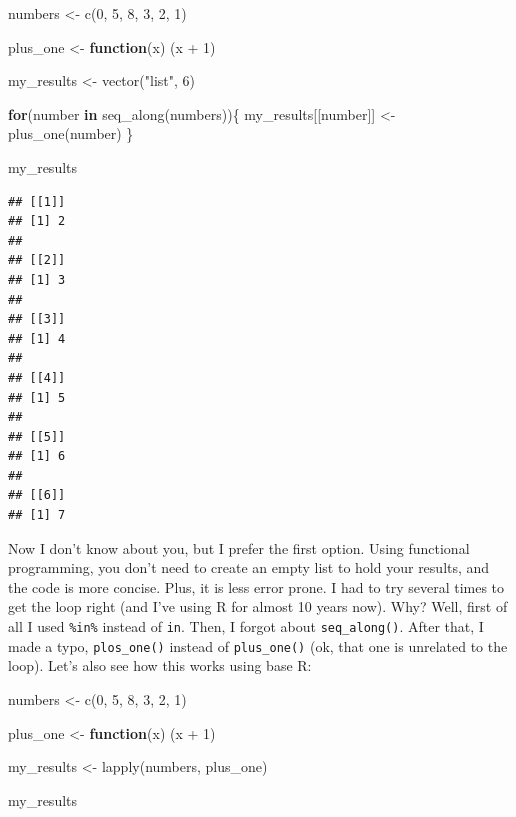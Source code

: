 \documentclass[
]{article}
\newenvironment{Shaded}{\begin{snugshade}}{\end{snugshade}}
\newcommand{\ControlFlowTok}[1]{\textcolor[rgb]{0.13,0.29,0.53}{\textbf{#1}}}
\newcommand{\DecValTok}[1]{\textcolor[rgb]{0.00,0.00,0.81}{#1}}
\newcommand{\FunctionTok}[1]{\textcolor[rgb]{0.00,0.00,0.00}{#1}}
\newcommand{\NormalTok}[1]{#1}
\newcommand{\OtherTok}[1]{\textcolor[rgb]{0.56,0.35,0.01}{#1}}
\newcommand{\SpecialCharTok}[1]{\textcolor[rgb]{0.00,0.00,0.00}{#1}}
\newcommand{\StringTok}[1]{\textcolor[rgb]{0.31,0.60,0.02}{#1}}
\begin{document}
\begin{Shaded}
\begin{Highlighting}[]
\NormalTok{numbers }\OtherTok{\textless{}{-}} \FunctionTok{c}\NormalTok{(}\DecValTok{0}\NormalTok{, }\DecValTok{5}\NormalTok{, }\DecValTok{8}\NormalTok{, }\DecValTok{3}\NormalTok{, }\DecValTok{2}\NormalTok{, }\DecValTok{1}\NormalTok{)}

\NormalTok{plus\_one }\OtherTok{\textless{}{-}} \ControlFlowTok{function}\NormalTok{(x) (x }\SpecialCharTok{+} \DecValTok{1}\NormalTok{)}

\NormalTok{my\_results }\OtherTok{\textless{}{-}} \FunctionTok{vector}\NormalTok{(}\StringTok{"list"}\NormalTok{, }\DecValTok{6}\NormalTok{)}

\ControlFlowTok{for}\NormalTok{(number }\ControlFlowTok{in} \FunctionTok{seq\_along}\NormalTok{(numbers))\{}
\NormalTok{  my\_results[[number]] }\OtherTok{\textless{}{-}} \FunctionTok{plus\_one}\NormalTok{(number)}
\NormalTok{\}}

\NormalTok{my\_results}
\end{Highlighting}
\end{Shaded}

\begin{verbatim}
## [[1]]
## [1] 2
## 
## [[2]]
## [1] 3
## 
## [[3]]
## [1] 4
## 
## [[4]]
## [1] 5
## 
## [[5]]
## [1] 6
## 
## [[6]]
## [1] 7
\end{verbatim}

Now I don't know about you, but I prefer the first option. Using functional programming, you don't
need to create an empty list to hold your results, and the code is more concise. Plus,
it is less error prone. I had to try several times to get the loop right
(and I've using R for almost 10 years now). Why? Well, first of all I used \texttt{\%in\%} instead of \texttt{in}.
Then, I forgot about \texttt{seq\_along()}. After that, I made a typo, \texttt{plos\_one()} instead of \texttt{plus\_one()}
(ok, that one is unrelated to the loop). Let's also see how this works using base R:

\begin{Shaded}
\begin{Highlighting}[]
\NormalTok{numbers }\OtherTok{\textless{}{-}} \FunctionTok{c}\NormalTok{(}\DecValTok{0}\NormalTok{, }\DecValTok{5}\NormalTok{, }\DecValTok{8}\NormalTok{, }\DecValTok{3}\NormalTok{, }\DecValTok{2}\NormalTok{, }\DecValTok{1}\NormalTok{)}

\NormalTok{plus\_one }\OtherTok{\textless{}{-}} \ControlFlowTok{function}\NormalTok{(x) (x }\SpecialCharTok{+} \DecValTok{1}\NormalTok{)}

\NormalTok{my\_results }\OtherTok{\textless{}{-}} \FunctionTok{lapply}\NormalTok{(numbers, plus\_one)}

\NormalTok{my\_results}
\end{Highlighting}
\end{Shaded}
\end{document}
